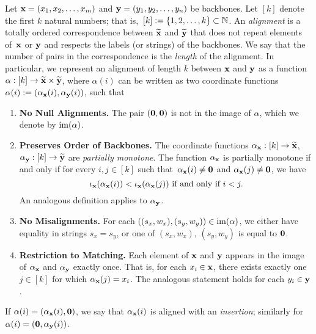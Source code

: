 \begin{defn}[Alignment]\label{def:alignment}
    Let $\textbf{x} = (x_1,x_2,\dots, x_m)$ and $\textbf{y} = (y_1,y_2,\dots, y_n)$ be
    backbones.
    Let $[k]$ denote the first $k$ natural numbers; that is,~$[k]:=\{ 1, 2, \dots, k\} \subset \mbox{$\mathbb N$}$.
    An \emph{alignment} is a totally ordered correspondence between $\widetilde{\textbf{x}}$ and
    $\widetilde{\textbf{y}}$ that does not repeat elements of~$\textbf{x}$ or $\textbf{y}$ and respects the
    labels (or strings) of the backbones. We say that the
    number of pairs in the correspondence is the \emph{length} of the alignment.
    In particular, we represent an alignment of length $k$ between $\textbf{x}$ and
    $\textbf{y}$ as a  function $\alpha: [k] \to \widetilde{\textbf{x}} \times \widetilde{\textbf{y}}$,
    where $\alpha(i)$ can be written as two coordinate
    functions~$\alpha(i):= (\alpha_{\textbf{x}}(i), \alpha_{\textbf{y}}(i))$, such that
    \begin{enumerate}
        \item \textbf{No Null Alignments.} The pair $({\mathbf{0}},{\mathbf{0}})$ is not in the image of
            $\alpha$, which we denote by $\operatorname{im}(\alpha)$. \label{property:nullalignments}
        \item \textbf{Preserves Order of Backbones.} The coordinate functions $\alpha_{\textbf{x}}: [k] \to \widetilde{\textbf{x}}$, $\alpha_{\textbf{y}}:
            [k]\rightarrow \widetilde{\textbf{y}}$ are \emph{partially monotone}. The
            function $\alpha_{\textbf{x}}$ is partially monotone if and only if for every
            $i,j \in [k]$ such that~$\alpha_{\textbf{x}}(i)\neq {\mathbf{0}}$ and $\alpha_{\textbf{x}}(j) \neq
            {\mathbf{0}}$, we have
            $$
                \iota_{\textbf{x}}(\alpha_{\textbf{x}}(i)) < \iota_{\textbf{x}}(\alpha_{\textbf{x}}(j))
                \text{ if and only if } i < j.
            $$
            An analogous definition applies to $\alpha_{\textbf{y}}$. \label{property:preservesbackbones}
        \item \textbf{No Misalignments.}
            For each $\left((s_x,w_x),(s_y,w_y)\right) \in \operatorname{im}(\alpha)$,
            we either have equality in strings \mbox{$s_x = s_y$}, or one of $(s_x, w_x)$, $(s_y, w_y)$ is equal to ${\mathbf{0}}$.  
            \label{property:nomisalignments}

        \item \textbf{Restriction to Matching.} Each element of $\textbf{x}$ and $\textbf{y}$ appears in the image of $\alpha_{\textbf{x}}$ and $\alpha_{\textbf{y}}$ exactly once. That is, for each $x_i \in \textbf{x}$, there exists exactly one $j \in [k]$ for which $\alpha_{\textbf{x}}(j)=x_i$. The analogous statement holds for each $y_i \in \textbf{y}$. \label{property:restrictiontomatching}
    \end{enumerate}
    If $\alpha(i)=(\alpha_{\textbf{x}}(i), {\mathbf{0}})$, we say that $\alpha_{\textbf{x}}(i)$ is aligned
    with an \emph{insertion}; similarly for $\alpha(i)=({\mathbf{0}},\alpha_{\textbf{y}}(i))$.    %
\end{defn}

